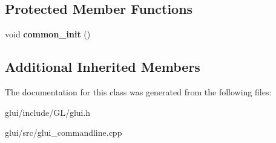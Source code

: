 \subsection*{Protected Member Functions}
\begin{DoxyCompactItemize}
\item 
\hypertarget{classGLUI__CommandLine_a21eeafb7d6f3df4d3ddee365422894b6}{void {\bfseries common\-\_\-init} ()}\label{classGLUI__CommandLine_a21eeafb7d6f3df4d3ddee365422894b6}

\end{DoxyCompactItemize}
\subsection*{Additional Inherited Members}


The documentation for this class was generated from the following files\-:\begin{DoxyCompactItemize}
\item 
glui/include/\-G\-L/glui.\-h\item 
glui/src/glui\-\_\-commandline.\-cpp\end{DoxyCompactItemize}
